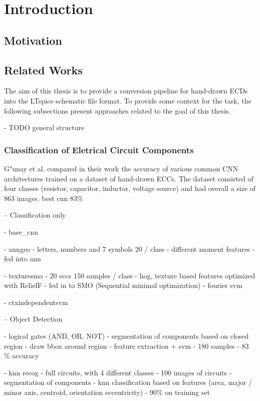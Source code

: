 \chapter{Introduction}

\section{Motivation}

\section{Related Works}

The aim of this thesis is to provide a conversion pipeline for hand-drawn \acp{ECD} into the LTspice schematic file format.
To provide some context for the task, the following subsections present approaches related to the goal of this thesis.

- TODO general structure

\subsection{Classification of Eletrical Circuit Components}

G"unay et al. \cite{ecd_basecnn} compared in their work the accuracy of various common \ac{CNN} architectures trained on a dataset of hand-drawn \acp{ECC}.
The dataset consisted of four classes (resistor, capacitor, inductor, voltage source) and had overall a size of 863 images. best cnn 83\%


-- Classification only

- base_cnn

- anngeo
- letters, numbers and 7 symbols 20 / class
- different moment features
- fed into ann

- texturesmo
- 20 eccs 150 samples / class
- hog, texture based features optimized with ReliefF
- fed in to SMO (Sequential minimal optimization)
- fourier svm

- ctxindependentsvm

-- Object Detection

- logical gates (AND, OR, NOT)
- segmentation of components based on closed region
- draw bbox around region
- feature extraction + svm
- 180 samples
- 83 \% accuracy

- knn recog
- full circuits, with 4 different classes
- 100 images of circuits
- segmentation of components
- knn classification based on features (area, major / minor axis, centroid, orientation
    eccentricity)
- 90\% on training set

